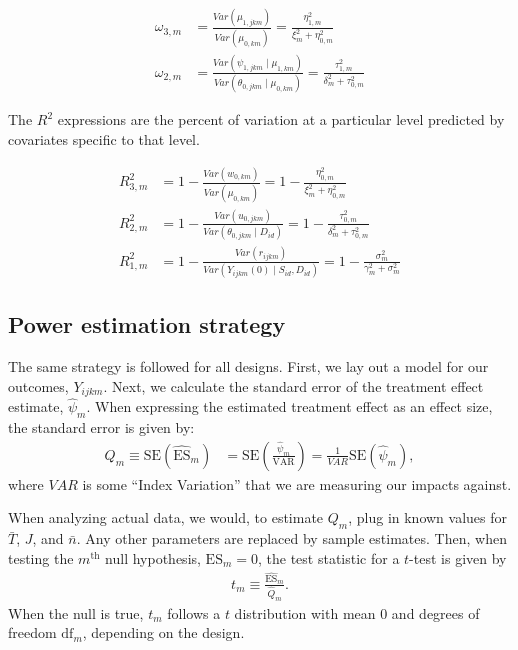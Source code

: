 \documentclass[12pt]{article}
\begin{document}
\begin{align*}
\omega_{3,m} &=  \frac{Var(\mu_{1,jkm})}{Var(\mu_{0,km})} = \frac{\eta^2_{1,m}}{\xi^2_m + \eta_{0,m}^2}\\
\omega_{2,m} &=  \frac{Var(\psi_{1,jkm} \mid \mu_{1,km})}{Var(\theta_{0,jkm} \mid \mu_{0,km})} = \frac{\tau^2_{1,m}}{\delta_m^2 + \tau^2_{0,m}}
\end{align*}

The $R^2$ expressions are the percent of variation at a particular level predicted by covariates specific to that level.

\begin{align*}
R_{3,m}^2 &= 1 - \frac{Var(w_{0,km})}{Var(\mu_{0,km})} = 1 - \frac{\eta^2_{0,m}}{\xi_m^2 + \eta^2_{0,m}} \\
R_{2,m}^2 &= 1 - \frac{Var(u_{0,jkm})}{Var(\theta_{0,jkm} \mid D_{id})} = 1 - \frac{\tau^2_{0,m}}{\delta_m^2 + \tau^2_{0,m}}\\
R^2_{1,m} &= 1 - \frac{Var(r_{ijkm})}{Var( Y_{ijkm}(0) \mid S_{id}, D_{id})} = 1 - \frac{ \sigma^2_m }{ \gamma_m^2 + \sigma^2_m }
\end{align*}



\subsection{Power estimation strategy}

The same strategy is followed for all designs.
First, we lay out a model for our outcomes, $Y_{ijkm}$.
Next, we calculate the standard error of the treatment effect estimate, $\hat{\psi}_m$.
When expressing the estimated treatment effect as an effect size, the standard error is given by:
\begin{align}\label{eqn:qm}
Q_m \equiv \text{SE}\left(\hat{\text{ES}}_m\right) &= \text{SE}\left(\frac{\hat{\psi}_m}{\mbox{VAR}}\right) = \frac{1}{VAR} \text{SE}\left(\hat{\psi}_m\right),
\end{align}
where $VAR$ is some ``Index Variation'' that we are measuring our impacts against.

When analyzing actual data, we would, to estimate $Q_m$, plug in known values for $\bar{T}$, $J$, and $\bar{n}$.
Any other parameters are replaced by sample estimates.
Then, when testing the $m^{\text{th}}$ null hypothesis, $\text{ES}_m = 0$, the test statistic for a $t$-test is given by
\begin{align}t_m \equiv \frac{\hat{\text{ES}}_m}{\hat{Q}_m}.\end{align}
When the null is true, $t_m$ follows a $t$ distribution with mean $0$ and degrees of freedom $\text{df}_m$, depending on the design.
\end{document}
